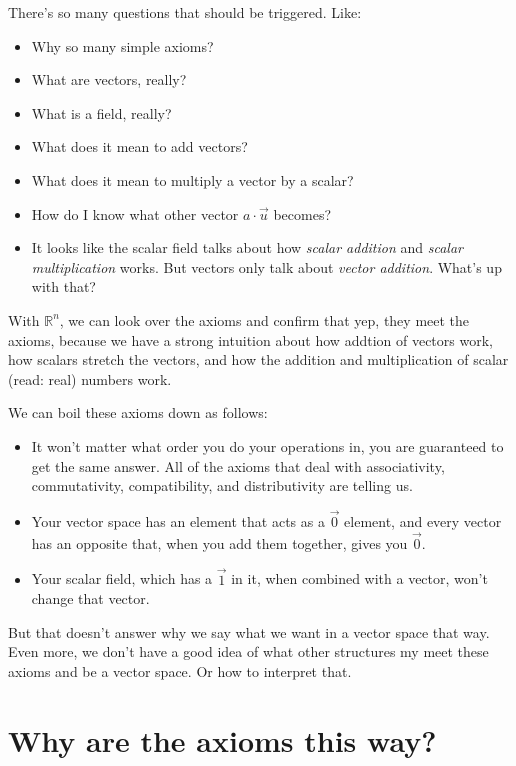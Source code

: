 \documentclass[
]{book}
\providecommand{\tightlist}{%
  \setlength{\itemsep}{0pt}\setlength{\parskip}{0pt}}
\begin{document}
There's so many questions that should be triggered. Like:

\begin{itemize}
\tightlist
\item
  Why so many simple axioms?
\item
  What are vectors, really?
\item
  What is a field, really?
\item
  What does it mean to add vectors?
\item
  What does it mean to multiply a vector by a scalar?
\item
  How do I know what other vector \(a \cdot \vec{u}\) becomes?
\item
  It looks like the scalar field talks about how \emph{scalar addition} and \emph{scalar multiplication} works. But vectors only talk about \emph{vector addition}. What's up with that?
\end{itemize}

With \(\mathbb{R}^n\), we can look over the axioms and confirm that yep, they meet the axioms, because we have a strong intuition about how addtion of vectors work, how scalars stretch the vectors, and how the addition and multiplication of scalar (read: real) numbers work.

We can boil these axioms down as follows:

\begin{itemize}
\tightlist
\item
  It won't matter what order you do your operations in, you are guaranteed to get the same answer. All of the axioms that deal with associativity, commutativity, compatibility, and distributivity are telling us.
\item
  Your vector space has an element that acts as a \(\vec{0}\) element, and every vector has an opposite that, when you add them together, gives you \(\vec{0}\).
\item
  Your scalar field, which has a \(\vec{1}\) in it, when combined with a vector, won't change that vector.
\end{itemize}

But that doesn't answer why we say what we want in a vector space that way. Even more, we don't have a good idea of what other structures my meet these axioms and be a vector space. Or how to interpret that.

\hypertarget{why-are-the-axioms-this-way}{%
\section{Why are the axioms this way?}\label{why-are-the-axioms-this-way}}
\end{document}
